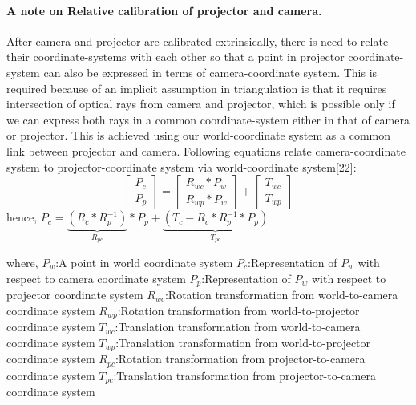 \paragraph{A note on Relative calibration of projector and camera.}  
After camera and projector are calibrated extrinsically, there is need to relate their  
coordinate-systems with each other so that a point in projector coordinate-system can  
also be expressed in terms of camera-coordinate system. This is required because of  
an implicit assumption in triangulation is that it requires intersection of optical rays from  
camera and projector, which is possible only if we can express both rays in a common  
coordinate-system either in that of camera or projector. This is achieved  
using our world-coordinate system as a common link between projector and camera.  
Following equations relate camera-coordinate system to projector-coordinate system  
via world-coordinate system[22]:  
\begin{equation}  
\begin{bmatrix}  
P_c \\  
P_p  
\end{bmatrix}  
=\begin{bmatrix}  
R_{wc}*P_w \\  
R_{wp}*P_w  
\end{bmatrix}  
+\begin{bmatrix}  
T_{wc} \\  
T_{wp}  
\end{bmatrix}  
\end{equation}  
hence,\newline  
$P_c=\underbrace{(R_c*R_p^{-1})}_{R_{pc}}*P_p+\underbrace{(T_c-R_c*R_p^{-1}*P_p)}_{T_{pc}}$  
  
\noindent  
where,\newline  
$P_w$:A point in world coordinate system\newline  
$P_c$:Representation of $P_w$ with respect to camera coordinate system\newline  
$P_p$:Representation of $P_w$ with respect to projector coordinate system\newline  
$R_{wc}$:Rotation transformation from world-to-camera coordinate system\newline  
$R_{wp}$:Rotation transformation from world-to-projector coordinate system\newline  
$T_{wc}$:Translation transformation from world-to-camera coordinate system\newline  
$T_{wp}$:Translation transformation from world-to-projector coordinate system\newline  
$R_{pc}$:Rotation transformation from projector-to-camera coordinate system\newline  
$T_{pc}$:Translation transformation from projector-to-camera coordinate system\newline  
  
